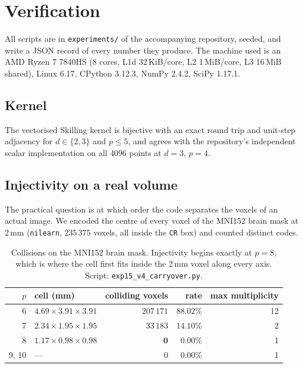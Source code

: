 \documentclass[11pt,a4paper]{article}
\theoremstyle{plain}
\theoremstyle{definition}
\theoremstyle{remark}
\begin{document}
\section{Verification}

All scripts are in \texttt{experiments/} of the accompanying repository,
seeded, and write a JSON record of every number they produce. The machine
used is an AMD Ryzen 7 7840HS (8 cores, L1d 32\,KiB/core, L2 1\,MiB/core,
L3 16\,MiB shared), Linux 6.17, CPython 3.12.3, NumPy 2.4.2, SciPy 1.17.1.

\subsection{Kernel}

The vectorised Skilling kernel is bijective with an exact round trip and
unit-step adjacency for $d\in\{2,3\}$ and $p\le5$, and agrees with the
repository's independent scalar implementation on all $4096$ points at
$d=3$, $p=4$.

\subsection{Injectivity on a real volume}\label{sec:collisions}

The practical question is at which order the code separates the voxels of
an actual image. We encoded the centre of every voxel of the MNI152 brain
mask at 2\,mm (\texttt{nilearn}, $235\,375$ voxels, all inside the
\texttt{CR} box) and counted distinct codes.

\begin{table}[h]
\centering
\begin{tabular}{rlrrr}
\toprule
$p$ & cell (mm) & colliding voxels & rate & max multiplicity\\
\midrule
6  & $4.69\times3.91\times3.91$ & $207\,171$ & $88.02\%$ & 12\\
7  & $2.34\times1.95\times1.95$ & $33\,183$  & $14.10\%$ & 2\\
8  & $1.17\times0.98\times0.98$ & $\mathbf{0}$ & $0.00\%$ & 1\\
9, 10 & --- & $0$ & $0.00\%$ & 1\\
\bottomrule
\end{tabular}
\caption{Collisions on the MNI152 brain mask. Injectivity begins exactly
at $p=8$, which is where the cell first fits inside the 2\,mm voxel along
every axis. Script: \texttt{exp15\_v4\_carryover.py}.}
\label{tab:collisions}
\end{table}
\end{document}

